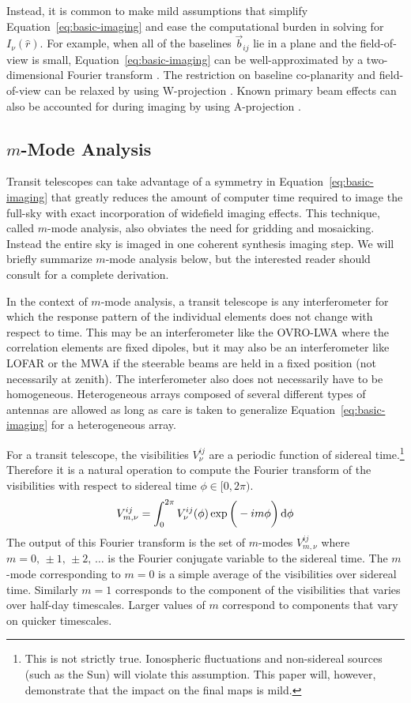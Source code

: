 \documentclass[twocolumn]{aastex61}
\renewcommand{\d}{{\rm d}}
\begin{document}
Instead, it is common to make mild assumptions that simplify Equation~\ref{eq:basic-imaging} and
ease the computational burden in solving for $I_\nu(\hat r)$. For example, when all of the baselines
$\vec b_{ij}$ lie in a plane and the field-of-view is small, Equation~\ref{eq:basic-imaging} can be
well-approximated by a two-dimensional Fourier transform \citep{2001isra.book.....T}. The
restriction on baseline co-planarity and field-of-view can be relaxed by using W-projection
\citep{2008ISTSP...2..647C}. Known primary beam effects can also be accounted for during imaging by
using A-projection \citep{2013ApJ...770...91B}.

\subsection{$m$-Mode Analysis}\label{sec:mmode-analysis}

Transit telescopes can take advantage of a symmetry in Equation~\ref{eq:basic-imaging} that greatly
reduces the amount of computer time required to image the full-sky with exact incorporation of
widefield imaging effects. This technique, called $m$-mode analysis, also obviates the need for
gridding and mosaicking. Instead the entire sky is imaged in one coherent synthesis imaging step.  We
will briefly summarize $m$-mode analysis below, but the interested reader should consult
\citet{2014ApJ...781...57S, 2015PhRvD..91h3514S} for a complete derivation.

In the context of $m$-mode analysis, a transit telescope is any interferometer for which the
response pattern of the individual elements does not change with respect to time. This may be an
interferometer like the OVRO-LWA where the correlation elements are fixed dipoles, but it may also
be an interferometer like LOFAR or the MWA if the steerable beams are held in a fixed position (not
necessarily at zenith). The interferometer also does not necessarily have to be homogeneous.
Heterogeneous arrays composed of several different types of antennas are allowed as long as care is
taken to generalize Equation~\ref{eq:basic-imaging} for a heterogeneous array.

For a transit telescope, the visibilities $V^{ij}_\nu$ are a periodic function of sidereal
time.\footnote{
    This is not strictly true. Ionospheric fluctuations and non-sidereal sources (such as the Sun)
    will violate this assumption. This paper will, however, demonstrate that the impact on the final
    maps is mild.
}
Therefore it is a natural operation to compute the Fourier transform of the visibilities with
respect to sidereal time $\phi\in[0,2\pi)$.
\begin{equation}
    V^{ij}_{m,\nu} = \int_0^{2\pi} V^{ij}_\nu(\phi)\exp\bigg(-im\phi\bigg)\,\d\phi
\end{equation}
The output of this Fourier transform is the set of $m$-modes $V^{ij}_{m,\nu}$ where
$m=0,\,\pm1,\,\pm2,\,\ldots$ is the Fourier conjugate variable to the sidereal time. The $m$-mode
corresponding to $m=0$ is a simple average of the visibilities over sidereal time. Similarly $m=1$
corresponds to the component of the visibilities that varies over half-day timescales. Larger values
of $m$ correspond to components that vary on quicker timescales.
\end{document}
